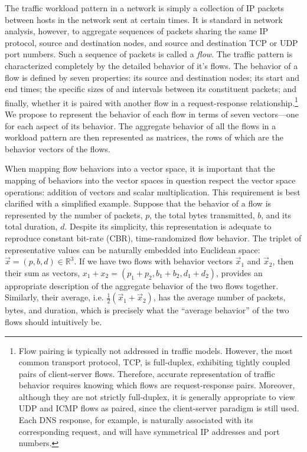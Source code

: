 \documentclass[conference]{IEEEtran}
\newcommand{\caps}[1]{{\small{#1}}}
\newcommand{\R}{\mathbb{R}}
\begin{document}
The traffic workload pattern in a network is simply a collection of \caps{IP} packets between hosts in the network sent at certain times. It is standard in network analysis, however, to aggregate sequences of packets sharing the same \caps{IP} protocol, source and destination nodes, and source and destination \caps{TCP} or \caps{UDP} port numbers. Such a sequence of packets is called a \textit{flow}. The traffic pattern is characterized completely by the detailed behavior of it's flows. The behavior of a flow is defined by seven properties: its source and destination nodes; its start and end times; the specific sizes of and intervals between its constituent packets; and finally, whether it is paired with another flow in a request-response relationship.\footnote{Flow pairing is typically not addressed in traffic models. However, the most common transport protocol, {\scriptsize{TCP}}, is full-duplex, exhibiting tightly coupled pairs of client-server flows. Therefore, accurate representation of traffic behavior requires knowing which flows are request-response pairs. Moreover, although they are not strictly full-duplex, it is generally appropriate to view {\scriptsize{UDP}} and {\scriptsize{ICMP}} flows as paired, since the client-server paradigm is still used. Each {\scriptsize{DNS}} response, for example, is naturally associated with its corresponding request, and will have symmetrical {\scriptsize{IP}} addresses and port numbers.} We propose to represent the behavior of each flow in terms of seven vectors---one for each aspect of its behavior. The aggregate behavior of all the flows in a workload pattern are then represented as matrices, the rows of which are the behavior vectors of the flows.

When mapping flow behaviors into a vector space, it is important that the mapping of behaviors into the vector spaces in question respect the vector space operations: addition of vectors and scalar multiplication. This requirement is best clarified with a simplified example. Suppose that the behavior of a flow is represented by the number of packets, $p$, the total bytes transmitted, $b$, and its total duration, $d$. Despite its simplicity, this representation is adequate to reproduce constant bit-rate (\caps{CBR}), time-randomized flow behavior. The triplet of representative values can be naturally embedded into Euclidean space: $\vec{x}=(p,b,d)\in\R^3$. If we have two flows with behavior vectors $\vec{x}_1$ and $\vec{x}_2$, then their sum as vectors, $x_1+x_2=(p_1+p_2,b_1+b_2,d_1+d_2)$, provides an appropriate description of the aggregate behavior of the two flows together. Similarly, their average, i.e. $\frac{1}{2}(\vec{x}_1+\vec{x}_2)$, has the average number of packets, bytes, and duration, which is precisely what the ``average behavior'' of the two flows should intuitively be.
\end{document}

